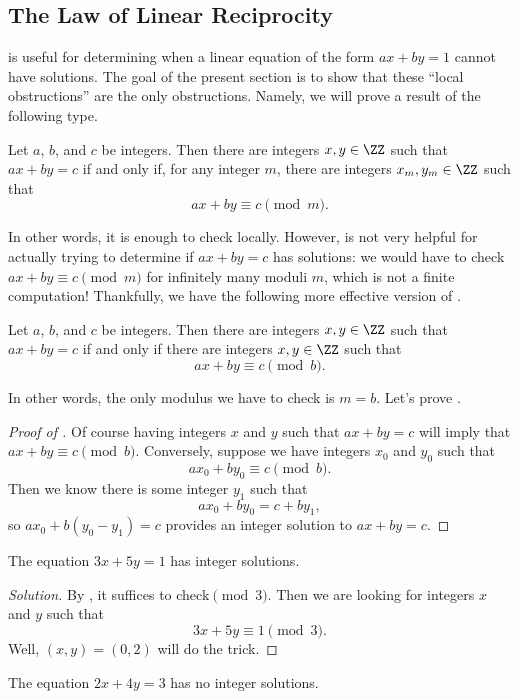 \documentclass[../notes.tex]{subfiles}
\begin{document}
\subsection{The Law of Linear Reciprocity}
 is useful for determining when a linear equation of the form $ax+by=1$ cannot have solutions. The goal of the present section is to show that these ``local obstructions'' are the only obstructions. Namely, we will prove a result of the following type.
\begin{prop} \label{prop:bezout-as-local-to-global}
	Let $a$, $b$, and $c$ be integers. Then there are integers $x,y\in\ZZ$ such that $ax+by=c$ if and only if, for any integer $m$, there are integers $x_m,y_m\in\ZZ$ such that
	\[ax+by\equiv c\pmod m.\]
\end{prop}
In other words, it is enough to check locally. However,  is not very helpful for actually trying to determine if $ax+by=c$ has solutions: we would have to check $ax+by\equiv c\pmod m$ for infinitely many moduli $m$, which is not a finite computation! Thankfully, we have the following more effective version of .
\begin{prop} \label{prop:bezout-as-local-to-global-2}
	Let $a$, $b$, and $c$ be integers. Then there are integers $x,y\in\ZZ$ such that $ax+by=c$ if and only if there are integers $x,y\in\ZZ$ such that
	\[ax+by\equiv c\pmod b.\]
\end{prop}
In other words, the only modulus we have to check is $m=b$. Let's prove .
\begin{proof}[Proof of ]
	Of course having integers $x$ and $y$ such that $ax+by=c$ will imply that $ax+by\equiv c\pmod b$. Conversely, suppose we have integers $x_0$ and $y_0$ such that
	\[ax_0+by_0\equiv c\pmod b.\]
	Then we know there is some integer $y_1$ such that
	\[ax_0+by_0=c+by_1,\]
	so $ax_0+b(y_0-y_1)=c$ provides an integer solution to $ax+by=c$.
\end{proof}
\begin{example}
	The equation $3x+5y=1$ has integer solutions.
\end{example}
\begin{proof}[Solution]
	By , it suffices to check$\pmod3$. Then we are looking for integers $x$ and $y$ such that
	\[3x+5y\equiv1\pmod3.\]
	Well, $(x,y)=(0,2)$ will do the trick.
\end{proof}
\begin{example}
	The equation $2x+4y=3$ has no integer solutions.
\end{example}
\end{document}
